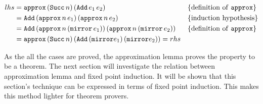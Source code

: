 \newcommand{\Adds}[2]{\hs{Add} \, #1 e_1 #2 \, #1 e_2 #2}
\newcommand{\Approxn}[0]{\hs{approx} \, n \,}
\newcommand{\ApproxSuccn}[0]{\hs{approx} \, (\hs{Succ} \, n) \,}
\newcommand{\mirmir}[0]{\hs{approx} \, n \, (\hs{mirror} \, }
\begin{align*}
lhs & = \ApproxSuccn (\Adds{}{})                                && \{\textrm{definition of \hs{approx}}\} \\
    & = \Adds{(\Approxn}{)}                                     && \{\textrm{induction hypothesis}\} \\
    & = \Adds{(\mirmir}{))}                            && \{\textrm{definition of \hs{approx}}\} \\
    & = \ApproxSuccn (\Adds{(\hs{mirror}}{)}) = rhs
\end{align*}
%
%

As the all the cases are proved, the approximation lemma proves the
property to be a theorem. The next section will investigate the
relation between approximation lemma and fixed point induction. It
will be shown that this section's technique can be expressed in terms
of fixed point induction. This makes this method lighter for theorem
provers.

